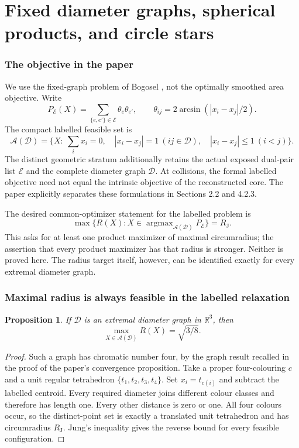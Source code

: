 \documentclass[11pt]{article}
\newtheorem{proposition}[theorem]{Proposition}
\theoremstyle{remark}\newtheorem{remark}[theorem]{Remark}
\newcommand{\R}{\mathbb R}
\newcommand{\RJ}{R_{\mathrm J}}
\begin{document}
\part{Fixed diameter graphs, spherical products, and circle stars}

\section{The objective in the paper}
We use the fixed-graph problem of Bogosel \cite{BogoselGraphs}, not the optimally
smoothed area objective. Write
\[
 P_{\mathcal E}(X)=\sum_{\{e,e'\}\in\mathcal E}\theta_e\theta_{e'},
 \qquad \theta_{ij}=2\arcsin(|x_i-x_j|/2).
\]
The compact labelled feasible set is
\[
 \mathcal A(\mathcal D)=\{X:\ \sum_i x_i=0,\quad
 |x_i-x_j|=1\ (ij\in\mathcal D),\quad |x_i-x_j|\leq1\ (i<j)\}.
\]
The distinct geometric stratum additionally retains the actual exposed
dual-pair list $\mathcal E$ and the complete diameter graph $\mathcal D$.
At collisions, the formal labelled objective need not equal the intrinsic
objective of the reconstructed core. The paper explicitly separates
these formulations in Sections 2.2 and 4.2.3.

The desired common-optimizer statement for the labelled problem is
\begin{equation}\label{fixed:common}
 \max\{R(X):X\in\operatorname{argmax}_{\mathcal A(\mathcal D)}
                         P_{\mathcal E}\}=\RJ.
\end{equation}
This asks for at least one product maximizer of maximal circumradius;
the assertion that every product maximizer has that radius is stronger.
Neither is proved here. The radius target itself, however, can be
identified exactly for every extremal diameter graph.

\section{Maximal radius is always feasible in the labelled relaxation}
\begin{proposition}\label{fixed:colour}
If $\mathcal D$ is an extremal diameter graph in $\R^3$, then
\[
 \max_{X\in\mathcal A(\mathcal D)}R(X)=\sqrt{3/8}.
\]
\end{proposition}
\begin{proof}
Such a graph has chromatic number four, by the graph result recalled
in the proof of the paper's convergence proposition. Take a proper
four-colouring $c$ and a unit regular tetrahedron $\{t_1,t_2,t_3,t_4\}$.
Set $x_i=t_{c(i)}$ and subtract the labelled centroid. Every required
diameter joins different colour classes and therefore has length one.
Every other distance is zero or one. All four colours occur, so the
distinct-point set is exactly a translated unit tetrahedron and has
circumradius $\RJ$. Jung's inequality gives the reverse bound for every
feasible configuration.
\end{proof}
\end{document}
